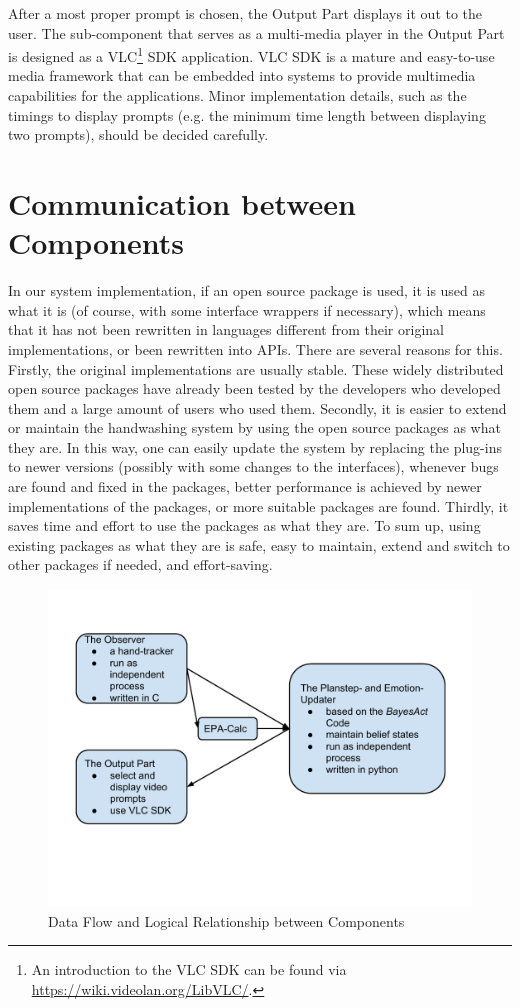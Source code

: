 After a most proper prompt is chosen, the Output Part displays it out to the user. The sub-component that serves as a multi-media player in the Output Part is designed as a VLC\footnote{An introduction to the VLC SDK can be found via \url{https://wiki.videolan.org/LibVLC/}.} SDK application. VLC SDK is a mature and easy-to-use media framework that can be embedded into systems to provide multimedia capabilities for the applications. Minor implementation details, such as the timings to display prompts (e.g. the minimum time length between displaying two prompts), should be decided carefully.

\section{Communication between Components}
\label{sec:design-commu}

In our system implementation, if an open source package is used, it is used as what it is (of course, with some interface wrappers if necessary), which means that it has not been rewritten in languages different from their original implementations, or been rewritten into APIs. There are several reasons for this. Firstly, the original implementations are usually stable. These widely distributed open source packages have already been tested by the developers who developed them and a large amount of users who used them. Secondly, it is easier to extend or maintain the handwashing system by using the open source packages as what they are. In this way, one can easily update the system by replacing the plug-ins to newer versions (possibly with some changes to the interfaces), whenever bugs are found and fixed in the packages, better performance is achieved by newer implementations of the packages, or more suitable packages are found. Thirdly, it saves time and effort to use the packages as what they are. To sum up, using existing packages as what they are is safe, easy to maintain, extend and switch to other packages if needed, and effort-saving.

\begin{figure}[htp]
\centering
\includegraphics[trim = 10mm 40mm 10mm 20mm, clip, width=0.9\linewidth]{fig/fig-dataflow.pdf}
\caption{Data Flow and Logical Relationship between Components}
\label{fig:dataflow}
\end{figure}


